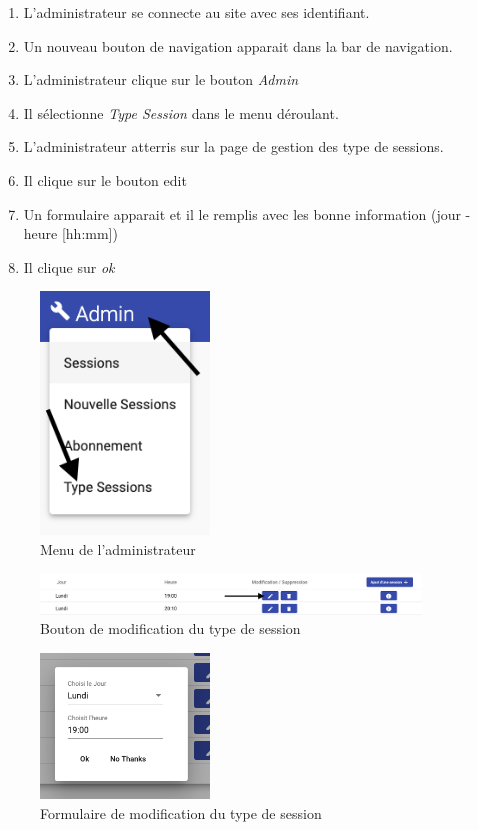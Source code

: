 \begin{enumerate}
	\item L'administrateur se connecte au site avec ses identifiant. 
	\item Un nouveau bouton de navigation apparait dans la bar de navigation. 
	\item L'administrateur clique sur le bouton \textit{Admin}
	\item Il sélectionne \textit{Type Session} dans le menu déroulant. 
	\item L'administrateur atterris sur la page de gestion des type de sessions. 
	\item Il clique sur le bouton edit
	\item Un formulaire apparait et il le remplis avec les bonne information (jour - heure [hh:mm])
	\item Il clique sur \textit{ok} 
\end{enumerate}

\vspace{\baselineskip}
\begin{figure}[h]
	\includegraphics[width=0.4\textwidth,center]{Figures/us13-1}
	\caption{Menu de l'administrateur}
\end{figure}

\newpage
\begin{figure}[h]
	\includegraphics[width=0.9\textwidth,center]{Figures/us13-2}
	\caption{Bouton de modification du type de session}
\end{figure}

\vspace{\baselineskip}
\begin{figure}[h]
	\includegraphics[width=0.4\textwidth,center]{Figures/us13-3}
	\caption{Formulaire de modification du type de session}
\end{figure}

